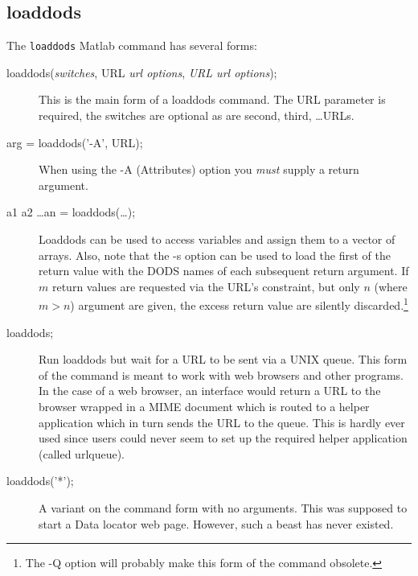 \documentclass{article}
\begin{document}
\subsection{loaddods}
The \texttt{loaddods} Matlab command has several forms:
\begin{description}
\item[loaddods(\emph{switches}, URL \emph{url options}, \emph{URL url options});]
  This is the main form of a loaddods command. The URL parameter is required,
  the switches are optional as are second, third, \ldots URLs.
  
\item[arg = loaddods('-A', URL);] When using the -A (Attributes) option you
  \emph{must} supply a return argument.

\item[a1 a2 \ldots an = loaddods(\ldots);] Loaddods can be used to access
  variables and assign them to a vector of arrays. Also, note that the -s
  option can be used to load the first of the return value with the DODS
  names of each subsequent return argument. If $m$ return values are
  requested via the URL's constraint, but only $n$ (where $m>n$) argument are
  given, the excess return value are silently discarded.\footnote{The -Q
    option will probably make this form of the command obsolete.}

\item[loaddods;] Run loaddods but wait for a URL to be sent via a UNIX queue.
  This form of the command is meant to work with web browsers and other
  programs. In the case of a web browser, an interface would return a URL to
  the browser wrapped in a MIME document which is routed to a helper
  application which in turn sends the URL to the queue. This is hardly ever
  used since users could never seem to set up the required helper application
  (called urlqueue).

\item[loaddods('*');] A variant on the command form with no arguments. This
  was supposed to start a Data locator web page. However, such a beast has
  never existed.
\end{description}
\end{document}
